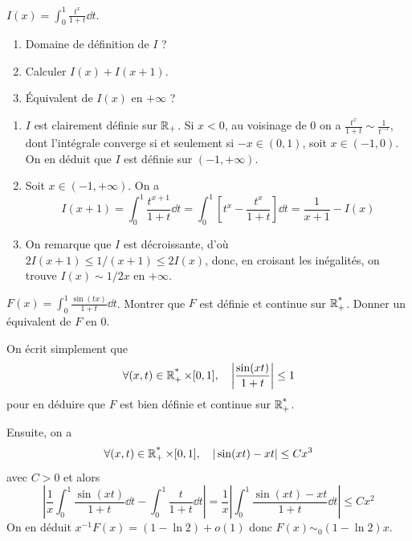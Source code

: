 \begin{exo}
	\label{intgen2}
	$I(x)=\int_0^1\frac{t^x}{1+t}\dd t$.
	\begin{enumerate}
		\item Domaine de définition de $I$ ?
		\item Calculer $I(x) + I(x + 1)$.
		\item Équivalent de $I(x)$ en $+\infty$ ?
	\end{enumerate}
\end{exo}

\begin{solution}
	\begin{enumerate}
		\item $I$ est clairement définie sur $\operatorname{\mathbb R}_+$. 
		Si $x<0$, au voisinage de $0$ on a $\frac{t^x}{1+t}\sim\frac1{t^{-x}}$, dont l'intégrale converge si et seulement si $-x\in(0,1)$, soit $x\in(-1,0)$.
		On en déduit que $I$ est définie sur $(-1,+\infty)$.
		
		\item Soit $x\in(-1,+\infty)$.
		On a 
		\[
			I(x+1)=\int_0^1\frac{t^{x+1}}{1+t}\dd t = \int_0^1\left[t^x-\frac{t^x}{1+t}\right]\dd t=\frac1{x+1}-I(x)
		\]
		\item On remarque que $I$ est décroissante, d'où $2I(x+1)\leq1/(x+1)\leq2 I(x)$, donc, en croisant les inégalités, on trouve $I(x)\sim 1/2x$ en $+\infty$.
	\end{enumerate}
\end{solution}

\begin{exo}
	\label{intgen3}
	$F(x) = \int_0^1\frac{\sin(tx)}{1+t}\dd t$. Montrer que $F$ est définie et continue sur $\operatorname{\mathbb R_+^*}$. Donner un équivalent de $F$ en $0$.
\end{exo}

\begin{solution}
	On écrit simplement que 
	\[
		\forall (x,t)\in\operatorname{\mathbb R_+^*}\times[0,1],\quad \left|\frac{\sin(xt)}{1+t}\right|\leq1
	\]
	pour en déduire que $F$ est bien définie et continue sur $\operatorname{\mathbb R_+^*}$.

	Ensuite, on a 
	\[
		\forall (x,t)\in\operatorname{\mathbb R_+^*}\times[0,1],\quad |\sin(xt) - xt|\leq Cx^3
	\]
	avec $C > 0$ et alors 
	\[
		\left|\frac1x\int_0^1\frac{\sin(xt)}{1+t}\dd t - \int_0^1\frac t{1+t}\dd t\right| = \frac1x\left|\int_0^1\frac{\sin(xt) - xt}{1 + t}\dd t\right|\leq Cx^2
	\]
	On en déduit $x^{-1}F(x) = (1-\ln2) + o(1)$ donc $F(x)\sim_0 (1 - \ln2)x$.
\end{solution}


